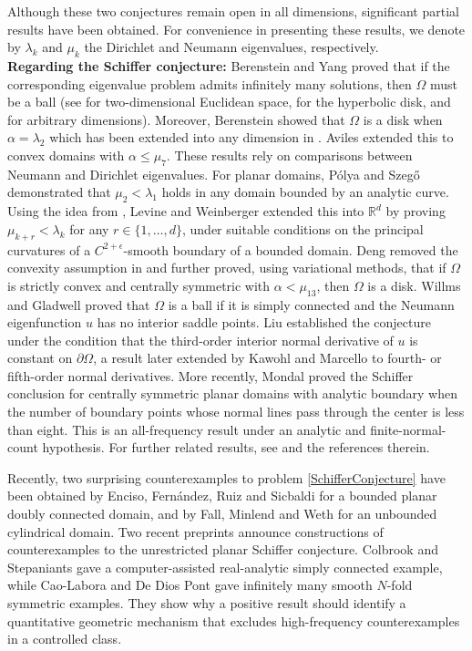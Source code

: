 \documentclass[12pt]{article}
\numberwithin{equation}{section}
\numberwithin{equation}{section}
\begin{document}
Although these two conjectures remain open in all dimensions, significant partial results have been obtained. For convenience in presenting these results, we denote by $\lambda_k$ and $\mu_k$ the Dirichlet and Neumann eigenvalues, respectively.\\

\textbf{Regarding the Schiffer conjecture:} Berenstein and Yang \cite{Berenstein,Berenstein1,Berenstein2} proved that if the corresponding eigenvalue problem admits infinitely many solutions, then $\Omega$ must be a ball (see \cite{Berenstein} for two-dimensional Euclidean space, \cite{Berenstein1} for the hyperbolic disk, and \cite{Berenstein2} for arbitrary dimensions). Moreover, Berenstein \cite{Berenstein} showed that $\Omega$ is a disk when $\alpha=\lambda_2$ which has been extended into any dimension in \cite{DaiLS}. Aviles \cite{Aviles} extended this to convex domains with $\alpha\leq\mu_7$. These results rely on comparisons between Neumann and Dirichlet eigenvalues. For planar domains, P\'{o}lya and Szeg\H{o} \cite{Polya, Szego} demonstrated that $\mu_2<\lambda_1$ holds in any domain bounded by an analytic curve. Using the idea from \cite{Payne}, Levine and Weinberger \cite{Levine} extended this into $\mathbb{R}^d$ by proving $\mu_{k+r}<\lambda_k$ for any $r\in\{1,\ldots,d\}$, under suitable conditions on the principal curvatures of a
$C^{2+\epsilon}$-smooth boundary of a bounded domain. Deng \cite{Deng} removed the convexity assumption in \cite{Aviles} and further proved, using variational methods, that if $\Omega$ is strictly convex and centrally symmetric with $\alpha<\mu_{13}$, then $\Omega$ is a disk. Willms and Gladwell \cite{WillmsGladwell} proved that $\Omega$ is a ball if it is simply connected and the Neumann eigenfunction $u$ has no interior saddle points. Liu \cite{Liu} established the conjecture under the condition that the third-order interior normal derivative of $u$ is constant on $\partial\Omega$, a result later extended by Kawohl and Marcello \cite{Kawohl} to fourth- or fifth-order normal derivatives. More recently, Mondal \cite{Mondal} proved the Schiffer
conclusion for centrally symmetric planar domains with analytic boundary
when the number of boundary points whose normal lines pass through the
center is less than eight.  This is an all-frequency result under an
analytic and finite-normal-count hypothesis. For further related results, see \cite{Bagchi, Garofalo, Friedlander} and the references therein.

Recently, two surprising counterexamples to problem \eqref{SchifferConjecture} have been obtained by Enciso, Fern\'{a}ndez, Ruiz and Sicbaldi \cite{EncisoFRS} for a bounded planar doubly connected domain, and by Fall, Minlend and Weth \cite{FallMW} for an unbounded cylindrical domain. Two recent preprints announce constructions of counterexamples to the
unrestricted planar Schiffer conjecture.  Colbrook and Stepaniants
\cite{ColbrookStepaniants} gave a computer-assisted real-analytic simply
connected example, while Cao-Labora and De Dios Pont \cite{CaoDeDios} gave
infinitely many smooth $N$-fold symmetric examples. They show why a positive result
should identify a quantitative geometric mechanism that excludes
high-frequency counterexamples in a controlled class.\\
\end{document}
